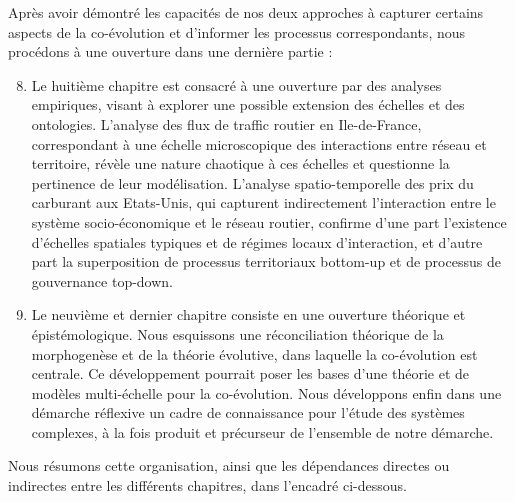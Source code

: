 {\begin{enumerate}
\end{enumerate}
Après avoir démontré les capacités de nos deux approches à capturer certains aspects de la co-évolution et d'informer les processus correspondants, nous procédons à une ouverture dans une dernière partie :
\begin{enumerate}\setcounter{enumi}{7}
	\item Le huitième chapitre est consacré à une ouverture par des analyses empiriques, visant à explorer une possible extension des échelles et des ontologies. L'analyse des flux de traffic routier en Ile-de-France, correspondant à une échelle microscopique des interactions entre réseau et territoire, révèle une nature chaotique à ces échelles et questionne la pertinence de leur modélisation. L'analyse spatio-temporelle des prix du carburant aux Etats-Unis, qui capturent indirectement l'interaction entre le système socio-économique et le réseau routier, confirme d'une part l'existence d'échelles spatiales typiques et de régimes locaux d'interaction, et d'autre part la superposition de processus territoriaux bottom-up et de processus de gouvernance top-down.
	\item Le neuvième et dernier chapitre consiste en une ouverture théorique et épistémologique. Nous esquissons une réconciliation théorique de la morphogenèse et de la théorie évolutive, dans laquelle la co-évolution est centrale. Ce développement pourrait poser les bases d'une théorie et de modèles multi-échelle pour la co-évolution. Nous développons enfin dans une démarche réflexive un cadre de connaissance pour l'étude des systèmes complexes, à la fois produit et précurseur de l'ensemble de notre démarche.
\end{enumerate}
}



Nous résumons cette organisation, ainsi que les dépendances directes ou indirectes entre les différents chapitres, dans l'encadré ci-dessous.



